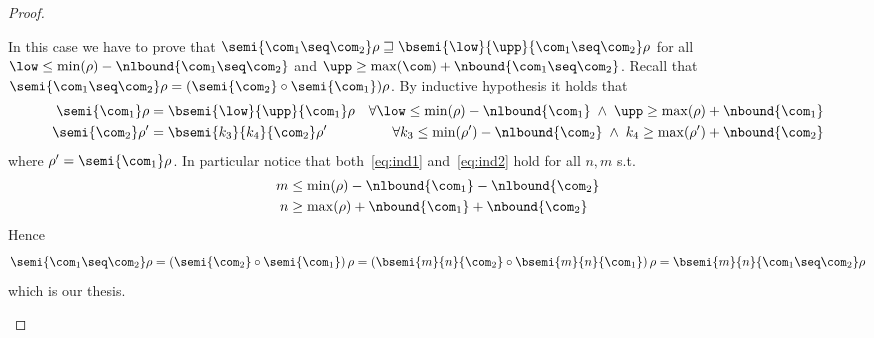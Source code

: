 \begin{proof}
\begin{inductive}
     In this case we have to prove that
    \(\semi{\com_1 \seq \com_2}\rho \sqsupseteq
    \bsemi{\low}{\upp}{\com_1 \seq \com_2}\rho\) for all
    \({\low \leq \min(\rho) - \nlbound{\com_1 \seq \com_2}}\) and
    \({\upp \geq \max(\com) + \nbound{\com_1 \seq \com_2}}\). Recall
    that
    \(\semi{\com_1\seq\com_2}\rho = {\left(\semi{\com_2}
        \circ \semi{\com_1}\right)}\rho\). By inductive
    hypothesis it holds that
    \begin{align}
      \semi{\com_1}\rho & = \bsemi{\low}{\upp}{\com_1}\rho & \forall \low \leq \min(\rho) - \nlbound{\com_1} \; \land \; \upp \geq \max(\rho) + \nbound{\com_1}\label{eq:ind1}\\
      \semi{\com_2}\rho' & = \bsemi{k_3}{k_4}{\com_2}\rho' & \forall k_3 \leq \min(\rho') - \nlbound{\com_2} \; \land \; k_4 \geq \max(\rho') + \nbound{\com_2}\label{eq:ind2}
    \end{align}
    where \(\rho' = \semi{\com_1}\rho\). In particular notice
    that both\ \eqref{eq:ind1} and\ \eqref{eq:ind2} hold for all
    \(n,m\) s.t.
    \begin{align*}
      m & \leq \min(\rho) - \nlbound{\com_1} - \nlbound{\com_2} \\
      n & \geq \max(\rho) + \nbound{\com_1} + \nbound{\com_2}
    \end{align*}
    Hence
    \begin{equation*}
      \semi{\com_1 \seq \com_2}\rho =
      \left( \semi{\com_2} \circ \semi{\com_1}\right)\rho =
      \left(\bsemi{m}{n}{\com_2} \circ \bsemi{m}{n}{\com_1}\right)\rho =
      \bsemi{m}{n}{\com_1 \seq \com_2}\rho
    \end{equation*}
    which is our thesis.


\end{inductive}
\end{proof}
